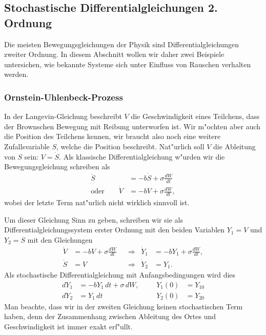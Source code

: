 \subsection{Stochastische Differentialgleichungen 2. Ordnung}
Die meisten Bewegungsgleichungen der Physik sind Differentialgleichungen
zweiter Ordnung.
In diesem Abschnitt wollen wir daher zwei Beispiele untersichen, wie
bekannte Systeme sich unter Einfluss von Rauschen verhalten werden.
%

\subsubsection{Ornstein-Uhlenbeck-Prozess}
In der Langevin-Gleichung beschreibt $V$ die Geschwindigkeit eines Teilchens,
dass der Brownschen Bewegung mit Reibung unterworfen ist.
Wir m"ochten aber auch die Position des Teilchens kennen, wir braucht
also noch eine weitere Zufallsvariable $S$, welche die Position
beschreibt.
Nat"urlich soll $V$ die Ableitung von $S$ sein: $V=\dot S$.
Als klassische Differentialgleichung w"urden wir die Bewegungsgleichung
schreiben als
\begin{align*}
\ddot S&=-b\dot S+\sigma\frac{dW}{dt}\\
\text{oder}\qquad
\dot  V&=-b V+\sigma\frac{dW}{dt},
\end{align*}
wobei der letzte Term nat"urlich nicht wirklich sinnvoll ist.

Um dieser Gleichung Sinn zu geben, schreiben wir sie als
Differentialgleichungssystem erster Ordnung mit den beiden Variablen
$Y_1=V$ und $Y_2=S$ mit den Gleichungen
\[
\begin{aligned}
\dot  V&=-b V+\sigma\frac{dW}{dt}
&&\Rightarrow&
\dot Y_1&=-b Y_1+\sigma \frac{dW}{dt},\\
\dot S&=V
&&\Rightarrow&
\dot Y_2&=Y_1.
\end{aligned}
\]
Als stochastische Differentialgleichung mit Anfangsbedingungen
wird dies
\begin{equation}
\begin{aligned}
dY_1&=-bY_1\,dt +\sigma\,dW,
&&&
Y_1(0)&=Y_{10}
\\
dY_2&=Y_1\,dt
&&&
Y_2(0)&=Y_{20}
\end{aligned}
\label{stochastisch:ornstein-uhlenbeck-dgl}
\end{equation}
Man beachte, dass wir in der zweiten Gleichung keinen stochastischen
Term haben, denn der Zusammenhang zwischen Ableitung des Ortes und
Geschwindigkeit ist immer exakt erf"ullt.

